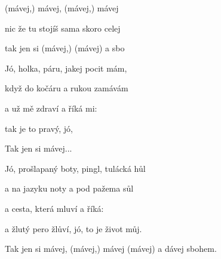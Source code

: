 

\zr
{} (mávej,) mávej, (mávej,) mávej 

nic  že tu stojíš sama skoro celej 

tak jen si  (mávej,)  (mávej) a   sbo
\kr

\zs
Jó,  holka, páru, jakej pocit mám,

když  do kočáru a rukou zamávám

a  už mě zdraví a říká mi: 

tak  je to pravý, jó,  
\ks

\zr
Tak jen si mávej...
\kr

\zs
Jó, prošlapaný boty, pingl, tulácká hůl

a na jazyku noty a pod pažema sůl

a cesta, která mluví a říká: 

a žlutý pero žlůví, jó, to je život můj.
\ks

\zr\kr

Tak jen si mávej, (mávej,) mávej (mávej) a dávej sbohem.

\kp
